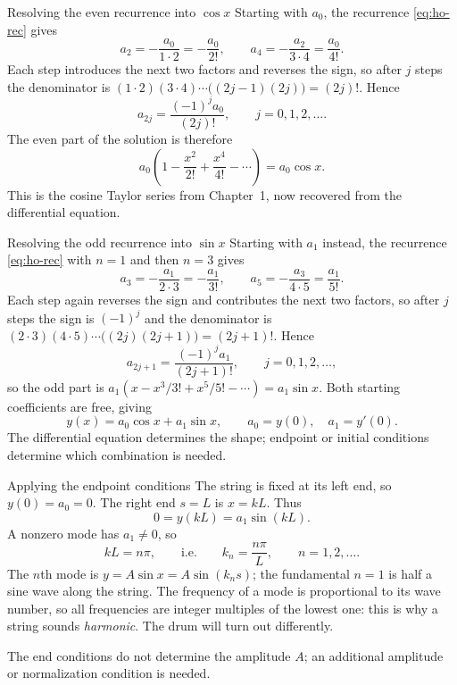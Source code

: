 \documentclass[11pt]{beamer}
\begin{document}
\begin{frame}{Resolving the even recurrence into $\cos x$}
\footnotesize
Starting with $a_0$, the recurrence \eqref{eq:ho-rec} gives
\[
 a_2=-\frac{a_0}{1\cdot2}=-\frac{a_0}{2!},\qquad
 a_4=-\frac{a_2}{3\cdot4}=\frac{a_0}{4!}.
\]
Each step introduces the next two factors and reverses the sign, so after $j$ steps the
denominator is $(1\cdot2)(3\cdot4)\cdots\bigl((2j-1)(2j)\bigr)=(2j)!$. Hence
\[
 a_{2j}=\frac{(-1)^j a_0}{(2j)!},\qquad j=0,1,2,\ldots.
\]
The even part of the solution is therefore
\[
 a_0\left(1-\frac{x^2}{2!}+\frac{x^4}{4!}-\cdots\right)=a_0\cos x.
\]
This is the cosine Taylor series from Chapter~1, now recovered from the differential equation.
\end{frame}

\begin{frame}{Resolving the odd recurrence into $\sin x$}
\footnotesize
Starting with $a_1$ instead, the recurrence \eqref{eq:ho-rec} with $n=1$ and then $n=3$ gives
\[
 a_3=-\frac{a_1}{2\cdot3}=-\frac{a_1}{3!},\qquad
 a_5=-\frac{a_3}{4\cdot5}=\frac{a_1}{5!}.
\]
Each step again reverses the sign and contributes the next two factors, so after $j$ steps the sign is $(-1)^j$ and the denominator is $(2\cdot3)(4\cdot5)\cdots\bigl((2j)(2j+1)\bigr)=(2j+1)!$. Hence
\[
 a_{2j+1}=\frac{(-1)^j a_1}{(2j+1)!},\qquad j=0,1,2,\ldots,
\]
so the odd part is $a_1(x-x^3/3!+x^5/5!-\cdots)=a_1\sin x$.
Both starting coefficients are free, giving
\[
 y(x)=a_0\cos x+a_1\sin x,\qquad a_0=y(0),\quad a_1=y'(0).
\]
The differential equation determines the shape; endpoint or initial conditions determine
which combination is needed.
\end{frame}

\begin{frame}{Applying the endpoint conditions}
\footnotesize
The string is fixed at its left end, so $y(0)=a_0=0$.
The right end $s=L$ is $x=kL$. Thus
\[
 0=y(kL)=a_1\sin(kL).
\]
A nonzero mode has $a_1\ne0$, so
\[
 kL=n\pi,\qquad\text{i.e.}\qquad k_n=\frac{n\pi}{L},\qquad n=1,2,\ldots.
\]
The $n$th mode is $y=A\sin x=A\sin(k_ns)$; the fundamental $n=1$ is half a sine wave
along the string.  The frequency of a mode is proportional to its wave number, so all
frequencies are integer multiples of the lowest one: this is why a string sounds
\emph{harmonic}.  The drum will turn out differently.

The end conditions do not determine the amplitude $A$; an additional
amplitude or normalization condition is needed.
\end{frame}
\end{document}
